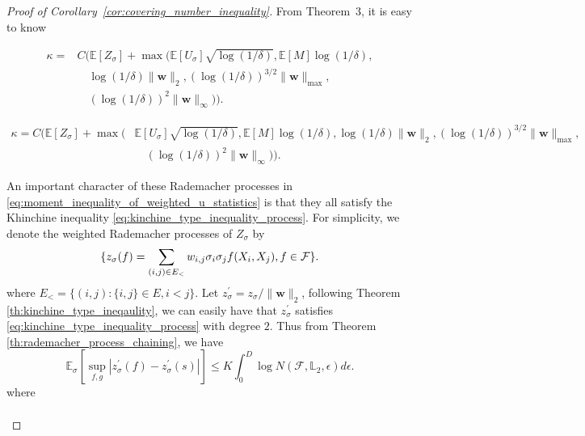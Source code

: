 \documentclass[letterpaper]{article} %
\def\DoubleColumn{}
\def\DoubleColumnEnd{}
\def\SingleColumn{}
\def\SingleColumnEnd{}
\newcommand{\E}{\mathbb{E}}
\newcommand{\weight}{\mathbf{w}}
\newcommand{\rademacher}{\sigma}
\newcommand{\pair}[1]{(#1)}
\newcommand{\lebesgue}{\mathbb{L}}
\begin{document}
\begin{proof}[Proof of Corollary~\ref{cor:covering_number_inequality}] %
    From Theorem~3, it is easy to know
    \DoubleColumn
    \begin{equation}
        \begin{aligned}
            \label{eq:moment_inequality_of_weighted_u_statistics}
            \kappa=&C(\E[Z_\rademacher]+\max(\E[U_\rademacher]\sqrt{\log(1/\delta)},\E[M]\log(1/\delta),\\
            &\quad\log(1/\delta)\|\weight{}\|_2,(\log(1/\delta))^{3/2}\|\weight{}\|_{\max},\\
            &\quad (\log(1/\delta))^2\|\weight{}\|_\infty)).
        \end{aligned}
    \end{equation}
    \DoubleColumnEnd
    \SingleColumn
    \begin{equation}
        \begin{aligned}
            \label{eq:moment_inequality_of_weighted_u_statistics}
            \kappa=C(\E[Z_\rademacher]+\max(&\E[U_\rademacher]\sqrt{\log(1/\delta)},\E[M]\log(1/\delta),\log(1/\delta)\|\weight{}\|_2,(\log(1/\delta))^{3/2}\|\weight{}\|_{\max},\\
            &\quad (\log(1/\delta))^2\|\weight{}\|_\infty)).
        \end{aligned}
    \end{equation}
    \SingleColumnEnd
An important character of these Rademacher processes in \eqref{eq:moment_inequality_of_weighted_u_statistics} is that they all satisfy the Khinchine inequality \eqref{eq:kinchine_type_inequality_process}. For simplicity, we denote the weighted Rademacher processes of $Z_\rademacher$ by 
\[\{z_\rademacher(f)=\sum_{\pair{i,j}\in E_<}w_{i,j}\rademacher_i\rademacher_j\linebreak f(X_i,X_j), f\in\mathcal{F}\}.\]
where $E_<=\{(i,j): \{i,j\}\in E, i<j\}$. Let $z_\rademacher^\prime=z_\rademacher/\|\weight{}\|_2$, following Theorem \ref{th:kinchine_type_ineqaulity}, we can easily have that $z_\rademacher^\prime$ satisfies \eqref{eq:kinchine_type_inequality_process} with degree $2$. Thus from Theorem \ref{th:rademacher_process_chaining}, we have
\begin{equation}
    \label{eq:weighted_rademacher_process_prove_1}
    \E_\rademacher[\sup_{f,g}|z^\prime_\rademacher(f)-z^\prime_\rademacher(s)|]\le K\int_0^D\log N(\mathcal F,\lebesgue{}_2,\epsilon)d\epsilon.
\end{equation}
where 
\DoubleColumn
\begin{align*}

\end{align*}
\end{proof}
\end{document}
